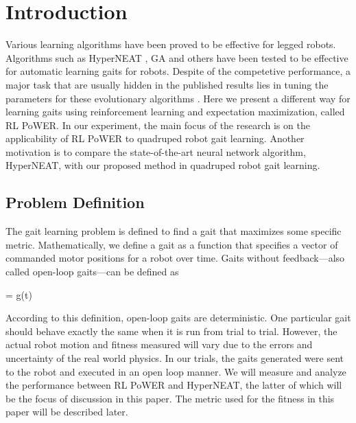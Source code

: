 \section{Introduction}


Various learning algorithms have been proved to be effective for
legged robots. Algorithms such as HyperNEAT \cite{yosinski2011evolving-robot-gaits},
GA \cite{chernova2004an-evolutionary-approach-to-gait} and others \cite{hornby2005autonomous-evolution-of-dynamic} \cite{zykov2004evolving-dynamic-gaits} \cite{tellez2006evolving-the-walking-behaviour} \cite{valsalam2008modular-neuroevolution-for-multilegged} have been tested to be effective for automatic learning gaits for robots. Despite of the competetive performance, a major
task that are usually hidden in the published results lies in tuning the parameters for
these evolutionary algorithms \cite{kormushev2011bipedal-walking-energya}. Here we present a
different way for learning gaits using reinforcement learning and expectation maximization, called RL PoWER. In our
experiment, the main focus of the research is on the applicability of RL PoWER to quadruped robot gait learning. Another motivation is to compare the state-of-the-art neural network algorithm, HyperNEAT, with our proposed method in quadruped robot gait learning.

\subsection{Problem Definition}
The gait learning problem is defined to find a
gait that maximizes some specific metric. Mathematically, we define a
gait as a function that specifies a vector of commanded motor
positions for a robot over time. Gaits without feedback---also
called open-loop gaits---can be defined as 

\be{} = g(t)\ee

According to this definition, open-loop gaits are deterministic. One
particular gait should behave exactly the same when it is run from
trial to trial. However, the actual robot motion and fitness measured
will vary due to the errors and uncertainty of the real world physics. In our
trials, the gaits generated were sent to the robot and
executed in an open loop manner. We will measure and analyze the performance between
RL PoWER and HyperNEAT, the latter of which will be the focus of discussion in this paper. The metric used for the fitness in this paper will be
described later.
